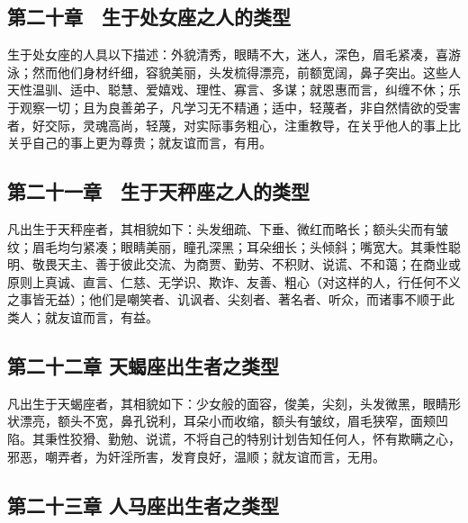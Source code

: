 
\subsection{第二十章　生于处女座之人的类型}

生于处女座的人具以下描述：外貌清秀，眼睛不大，迷人，深色，眉毛紧凑，喜游泳；然而他们身材纤细，容貌美丽，头发梳得漂亮，前额宽阔，鼻子突出。这些人天性温驯、适中、聪慧、爱嬉戏、理性、寡言、多谋；就恩惠而言，纠缠不休；乐于观察一切；且为良善弟子，凡学习无不精通；适中，轻蔑者，非自然情欲的受害者，好交际，灵魂高尚，轻蔑，对实际事务粗心，注重教导，在关乎他人的事上比关乎自己的事上更为尊贵；就友谊而言，有用。\par


\subsection{第二十一章　生于天秤座之人的类型}

凡出生于天秤座者，其相貌如下：头发细疏、下垂、微红而略长；额头尖而有皱纹；眉毛均匀紧凑；眼睛美丽，瞳孔深黑；耳朵细长；头倾斜；嘴宽大。其秉性聪明、敬畏天主、善于彼此交流、为商贾、勤劳、不积财、说谎、不和蔼；在商业或原则上真诚、直言、仁慈、无学识、欺诈、友善、粗心（对这样的人，行任何不义之事皆无益）；他们是嘲笑者、讥讽者、尖刻者、著名者、听众，而诸事不顺于此类人；就友谊而言，有益。\par


\subsection{第二十二章 天蝎座出生者之类型}

凡出生于天蝎座者，其相貌如下：少女般的面容，俊美，尖刻，头发微黑，眼睛形状漂亮，额头不宽，鼻孔锐利，耳朵小而收缩，额头有皱纹，眉毛狭窄，面颊凹陷。其秉性狡猾、勤勉、说谎，不将自己的特别计划告知任何人，怀有欺瞒之心，邪恶，嘲弄者，为奸淫所害，发育良好，温顺；就友谊而言，无用。\par


\subsection{第二十三章 人马座出生者之类型}

